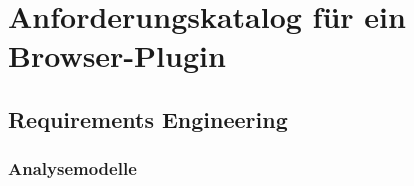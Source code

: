 
\chapter{Anforderungskatalog für ein Browser-Plugin}
\label{chp:Anforderungskatalog}

\section{Requirements Engineering}
\label{sec:Anforderungskatalog:req}


\subsection{Analysemodelle}
\label{sec:Anforderungskatalog:req:modelle}

